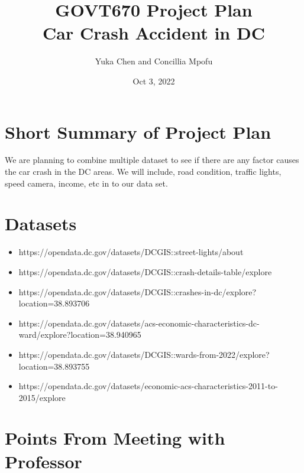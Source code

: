\documentclass[12pt]{article}
\title{%
  GOVT670 Project Plan\\
  \large Car Crash Accident in DC}
\author{Yuka Chen and Concillia Mpofu}
\date {Oct 3, 2022}
\begin{document}
\maketitle
\begin{abstract}

\end{abstract}
\doublespacing
\tableofcontents
\clearpage

\section*{Short Summary of Project Plan}
\label{sec:intro}

We are planning to combine multiple dataset to see if there are any factor causes the car crash in the DC areas. We will include, road condition, traffic lights, speed camera, income, etc in to our data set. 

\section{Datasets}
\label{sec:data}

\begin{singlespacing}
\begin{itemize}
\item https://opendata.dc.gov/datasets/DCGIS::street-lights/about
\item https://opendata.dc.gov/datasets/DCGIS::crash-details-table/explore
\item https://opendata.dc.gov/datasets/DCGIS::crashes-in-dc/explore?location=38.893706%
\item https://opendata.dc.gov/datasets/acs-economic-characteristics-dc-ward/explore?location=38.940965%
\item https://opendata.dc.gov/datasets/DCGIS::wards-from-2022/explore?location=38.893755%
\item https://opendata.dc.gov/datasets/economic-acs-characteristics-2011-to-2015/explore
\end{itemize}
\end{singlespacing}
\section{Points From Meeting with Professor}
\label{sec:notes}
\end{document}
